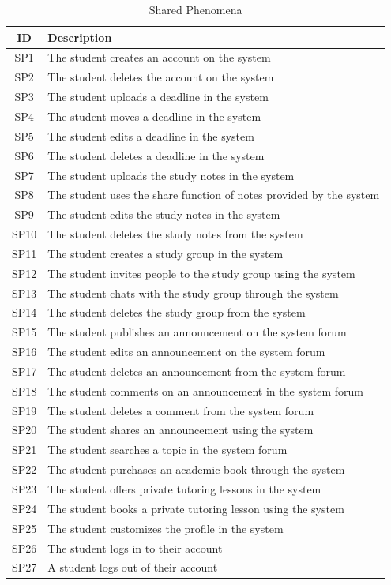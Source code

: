 \documentclass{article}
\begin{document}
\begin{table}[h!]
    \centering
    \begin{tabular}{|c|p{10cm}|}
    \hline
    \textbf{ID} & \textbf{Description} \\
    \hline
    SP1 & The student creates an account on the system \\
    SP2 & The student deletes the account on the system \\
    SP3 & The student uploads a deadline in the system \\
    SP4 & The student moves a deadline in the system \\
    SP5 & The student edits a deadline in the system \\
    SP6 & The student deletes a deadline in the system \\
    SP7 & The student uploads the study notes in the system \\
    SP8 & The student uses the share function of notes provided by the system \\
    SP9 & The student edits the study notes in the system \\
    SP10 & The student deletes the study notes from the system \\
    SP11 & The student creates a study group in the system \\
    SP12 & The student invites people to the study group using the system \\
    SP13 & The student chats with the study group through the system \\
    SP14 & The student deletes the study group from the system \\
    SP15 & The student publishes an announcement on the system forum \\
    SP16 & The student edits an announcement on the system forum \\
    SP17 & The student deletes an announcement from the system forum \\
    SP18 & The student comments on an announcement in the system forum \\
    SP19 & The student deletes a comment from the system forum \\
    SP20 & The student shares an announcement using the system \\
    SP21 & The student searches a topic in the system forum \\
    SP22 & The student purchases an academic book through the system \\
    SP23 & The student offers private tutoring lessons in the system \\
    SP24 & The student books a private tutoring lesson using the system \\
    SP25 & The student customizes the profile in the system \\
    SP26 & The student logs in to their account \\
    SP27 & A student logs out of their account \\
    \hline
    \end{tabular}
    \caption{Shared Phenomena}
    \label{tab:shared_phenomena}
\end{table}
\end{document}
